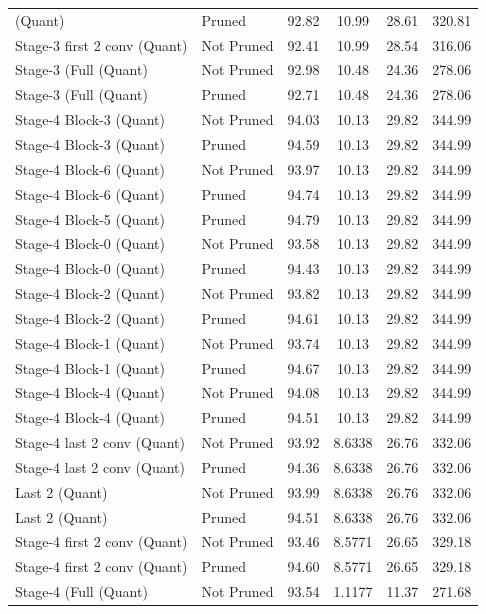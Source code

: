 \begin{table}
\begin{tabular}{llcccc}
(Quant) & Pruned & 92.82 & 10.99 & 28.61 & 320.81 \\
Stage-3 first 2 conv
(Quant) & Not Pruned & 92.41 & 10.99 & 28.54 & 316.06 \\
Stage-3 (Full
(Quant) & Not Pruned & 92.98 & 10.48 & 24.36 & 278.06 \\
Stage-3 (Full
(Quant) & Pruned & 92.71 & 10.48 & 24.36 & 278.06 \\
Stage-4 Block-3
(Quant) & Not Pruned & 94.03 & 10.13 & 29.82 & 344.99 \\
Stage-4 Block-3
(Quant) & Pruned & 94.59 & 10.13 & 29.82 & 344.99 \\
Stage-4 Block-6
(Quant) & Not Pruned & 93.97 & 10.13 & 29.82 & 344.99 \\
Stage-4 Block-6
(Quant) & Pruned & 94.74 & 10.13 & 29.82 & 344.99 \\
Stage-4 Block-5
(Quant) & Pruned & 94.79 & 10.13 & 29.82 & 344.99 \\
Stage-4 Block-0
(Quant) & Not Pruned & 93.58 & 10.13 & 29.82 & 344.99 \\
Stage-4 Block-0
(Quant) & Pruned & 94.43 & 10.13 & 29.82 & 344.99 \\
Stage-4 Block-2
(Quant) & Not Pruned & 93.82 & 10.13 & 29.82 & 344.99 \\
Stage-4 Block-2
(Quant) & Pruned & 94.61 & 10.13 & 29.82 & 344.99 \\
Stage-4 Block-1
(Quant) & Not Pruned & 93.74 & 10.13 & 29.82 & 344.99 \\
Stage-4 Block-1
(Quant) & Pruned & 94.67 & 10.13 & 29.82 & 344.99 \\
Stage-4 Block-4
(Quant) & Not Pruned & 94.08 & 10.13 & 29.82 & 344.99 \\
Stage-4 Block-4
(Quant) & Pruned & 94.51 & 10.13 & 29.82 & 344.99 \\
Stage-4 last 2 conv
(Quant) & Not Pruned & 93.92 & 8.6338 & 26.76 & 332.06 \\
Stage-4 last 2 conv
(Quant) & Pruned & 94.36 & 8.6338 & 26.76 & 332.06 \\
Last 2
(Quant) & Not Pruned & 93.99 & 8.6338 & 26.76 & 332.06 \\
Last 2
(Quant) & Pruned & 94.51 & 8.6338 & 26.76 & 332.06 \\
Stage-4 first 2 conv
(Quant) & Not Pruned & 93.46 & 8.5771 & 26.65 & 329.18 \\
Stage-4 first 2 conv
(Quant) & Pruned & 94.60 & 8.5771 & 26.65 & 329.18 \\
Stage-4 (Full
(Quant) & Not Pruned & 93.54 & 1.1177 & 11.37 & 271.68 \\

\end{tabular}
\end{table}
